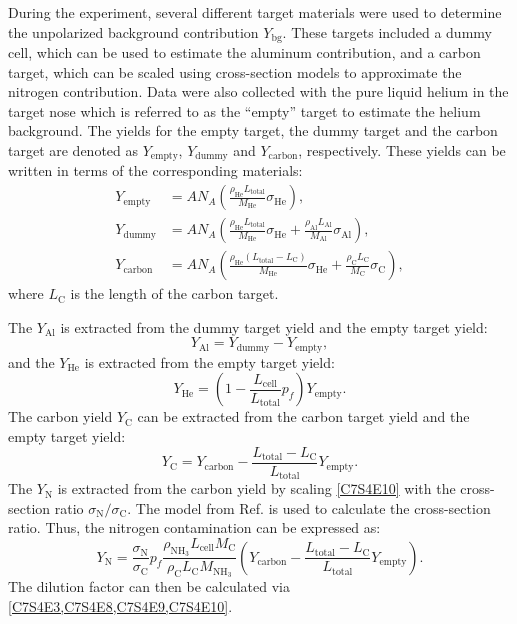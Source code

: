 During the experiment, several different target materials were used to determine the unpolarized background contribution $Y_{\mathrm{bg}}$. These targets included a dummy cell, which can be used to estimate the aluminum contribution, and a carbon target, which can be scaled using cross-section models to approximate the nitrogen contribution. Data were also collected with the pure liquid helium in the target nose which is referred to as the ``empty'' target to estimate the helium background. The yields for the empty target, the dummy target and the carbon target are denoted as $Y_{\mathrm{empty}}$, $Y_{\mathrm{dummy}}$ and $Y_{\mathrm{carbon}}$, respectively. These yields can be written in terms of the corresponding materials:
\begin{align} \label{C7S4E5}
Y_{\mathrm{empty}} & = AN_A\left(\frac{\rho_{\mathrm{He}}L_{\mathrm{total}}}{M_{\mathrm{He}}}\sigma_{\mathrm{He}}\right), \\ \label{C7S4E6}
Y_{\mathrm{dummy}} & = AN_A\left(\frac{\rho_{\mathrm{He}}L_{\mathrm{total}}}{M_{\mathrm{He}}}\sigma_{\mathrm{He}}+\frac{\rho_{\mathrm{Al}}L_{\mathrm{Al}}}{M_{\mathrm{Al}}}\sigma_{\mathrm{Al}}\right), \\ \label{C7S4E7}
Y_{\mathrm{carbon}} & = AN_A\left(\frac{\rho_{\mathrm{He}}(L_{\mathrm{total}}-L_{\mathrm{C}})}{M_{\mathrm{He}}}\sigma_{\mathrm{He}}+\frac{\rho_{\mathrm{C}}L_{\mathrm{C}}}{M_{\mathrm{C}}}\sigma_{\mathrm{C}}\right),
\end{align}
where $L_{\mathrm{C}}$ is the length of the carbon target.

The $Y_{\mathrm{Al}}$ is extracted from the dummy target yield and the empty target yield:
\begin{equation} \label{C7S4E8}
Y_{\mathrm{Al}} = Y_{\mathrm{dummy}}-Y_{\mathrm{empty}},
\end{equation}
and the $Y_{\mathrm{He}}$ is extracted from the empty target yield:
\begin{equation} \label{C7S4E9}
Y_{\mathrm{He}} = \left(1-\frac{L_{\mathrm{cell}}}{L_{\mathrm{total}}}p_f\right)Y_{\mathrm{empty}}.
\end{equation}
The carbon yield $Y_{\mathrm{C}}$ can be extracted from the carbon target yield and the empty target yield:
\begin{equation} \label{C7S4E10}
Y_{\mathrm{C}} = Y_{\mathrm{carbon}}-\frac{L_{\mathrm{total}}-L_{\mathrm{C}}}{L_{\mathrm{total}}}Y_{\mathrm{empty}}.
\end{equation}
The $Y_{\mathrm{N}}$ is extracted from the carbon yield by scaling \cref{C7S4E10} with the cross-section ratio $\sigma_{\mathrm{N}}/\sigma_{\mathrm{C}}$. The model from Ref. \cite{Bosted2008} is used to calculate the cross-section ratio. Thus, the nitrogen contamination can be expressed as:
\begin{equation} \label{C7S4E11}
Y_{\mathrm{N}} = \frac{\sigma_{\mathrm{N}}}{\sigma_{\mathrm{C}}}p_f\frac{\rho_{\mathrm{NH_3}}L_{\mathrm{cell}}M_{\mathrm{C}}}{\rho_{\mathrm{C}}L_{\mathrm{C}}M_{\mathrm{NH_3}}}\left(Y_{\mathrm{carbon}}-\frac{L_{\mathrm{total}}-L_{\mathrm{C}}}{L_{\mathrm{total}}}Y_{\mathrm{empty}}\right).
\end{equation}
The dilution factor can then be calculated via \cref{C7S4E3,C7S4E8,C7S4E9,C7S4E10}.

